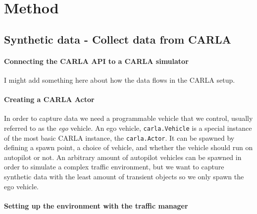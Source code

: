 \chapter{Method}

\section{Synthetic data - Collect data from CARLA}

\begin{comment}

Premise: Have no data to train a NeRF on
Question: How can we collect synthetic data from CARLA?

\begin{itemize}
    \item How can you spawn an agent, etc?
    \item How does all the basic CARLA-things work? 
    \item How to mount cameras, which sensors, location and rotation (transform).
\end{itemize}
\end{comment}

\subsubsection{Connecting the CARLA API to a CARLA simulator}
I might add something here about how the data flows in the CARLA setup.



\subsubsection{Creating a CARLA Actor}
In order to capture data we need a programmable vehicle that we control, usually referred to as the \textit{ego} vehicle. An ego vehicle, \texttt{carla.Vehicle} is a special instance of the most basic CARLA instance, the \texttt{carla.Actor}. It can be spawned by defining a spawn point, a choice of vehicle, and whether the vehicle should run on autopilot or not. An arbitrary amount of autopilot vehicles can be spawned in order to simulate a complex traffic environment, but we want to capture synthetic data with the least amount of transient objects so we only spawn the ego vehicle.


\subsubsection{Setting up the environment with the traffic manager}

